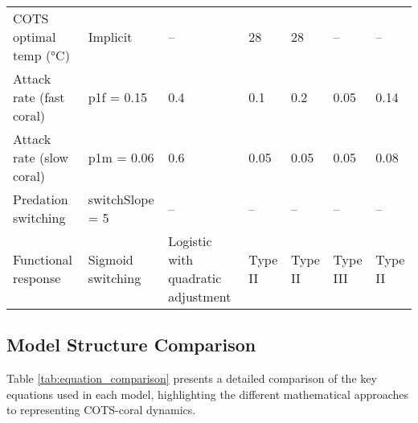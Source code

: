 \begin{landscape}
\begin{table}[H]
\begin{footnotesize}
\begin{tabular}{p{3.2cm}p{2.8cm}p{2.8cm}p{2.8cm}p{2.8cm}p{2.8cm}p{2.8cm}}
COTS optimal temp (°C) & Implicit & -- & 28 & 28 & -- & -- \\
 
Attack rate (fast coral) & p1f = 0.15 & 0.4 & 0.1 & 0.2 & 0.05 & 0.14 \\
 
Attack rate (slow coral) & p1m = 0.06 & 0.6 & 0.05 & 0.05 & 0.05 & 0.08 \\
 
Predation switching & switchSlope = 5 & -- & -- & -- & -- & -- \\
 
Functional response & Sigmoid switching & Logistic with quadratic adjustment & Type II & Type II & Type III & Type II \\
 
\end{tabular}
\end{footnotesize}
\end{table}
\end{landscape}

\subsection{Model Structure Comparison}
\label{subsec:structure_comparison}

Table \ref{tab:equation_comparison} presents a detailed comparison of the key equations used in each model, highlighting the different mathematical approaches to representing COTS-coral dynamics.



